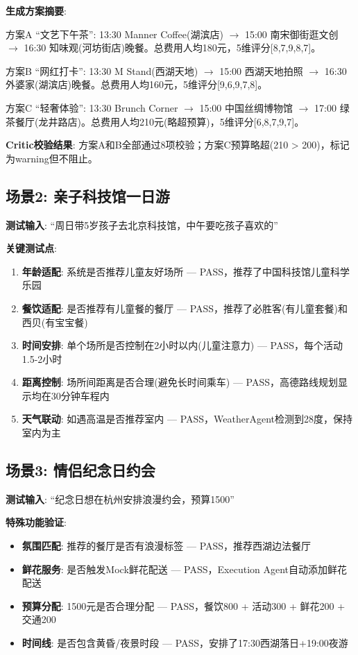 \documentclass[12pt,a4paper]{ctexart}
\begin{document}
\textbf{生成方案摘要}:

方案A ``文艺下午茶'': 13:30 Manner Coffee(湖滨店) $\to$ 15:00 南宋御街逛文创 $\to$ 16:30 知味观(河坊街店)晚餐。总费用人均180元，5维评分[8,7,9,8,7]。

方案B ``网红打卡'': 13:30 M Stand(西湖天地) $\to$ 15:00 西湖天地拍照 $\to$ 16:30 外婆家(湖滨店)晚餐。总费用人均160元，5维评分[9,6,9,7,8]。

方案C ``轻奢体验'': 13:30 Brunch Corner $\to$ 15:00 中国丝绸博物馆 $\to$ 17:00 绿茶餐厅(龙井路店)。总费用人均210元(略超预算)，5维评分[6,8,7,9,7]。

\textbf{Critic校验结果}: 方案A和B全部通过8项校验；方案C预算略超(210 > 200)，标记为warning但不阻止。

\subsection{场景2: 亲子科技馆一日游}

\textbf{测试输入}: ``周日带5岁孩子去北京科技馆，中午要吃孩子喜欢的''

\textbf{关键测试点}:
\begin{enumerate}
\item \textbf{年龄适配}: 系统是否推荐儿童友好场所 --- PASS，推荐了中国科技馆儿童科学乐园
\item \textbf{餐饮适配}: 是否推荐有儿童餐的餐厅 --- PASS，推荐了必胜客(有儿童套餐)和西贝(有宝宝餐)
\item \textbf{时间安排}: 单个场所是否控制在2小时以内(儿童注意力) --- PASS，每个活动1.5-2小时
\item \textbf{距离控制}: 场所间距离是否合理(避免长时间乘车) --- PASS，高德路线规划显示均在30分钟车程内
\item \textbf{天气联动}: 如遇高温是否推荐室内 --- PASS，WeatherAgent检测到28度，保持室内为主
\end{enumerate}

\subsection{场景3: 情侣纪念日约会}

\textbf{测试输入}: ``纪念日想在杭州安排浪漫约会，预算1500''

\textbf{特殊功能验证}:
\begin{itemize}
\item \textbf{氛围匹配}: 推荐的餐厅是否有浪漫标签 --- PASS，推荐西湖边法餐厅
\item \textbf{鲜花服务}: 是否触发Mock鲜花配送 --- PASS，Execution Agent自动添加鲜花配送
\item \textbf{预算分配}: 1500元是否合理分配 --- PASS，餐饮800 + 活动300 + 鲜花200 + 交通200
\item \textbf{时间线}: 是否包含黄昏/夜景时段 --- PASS，安排了17:30西湖落日+19:00夜游
\end{itemize}
\end{document}
